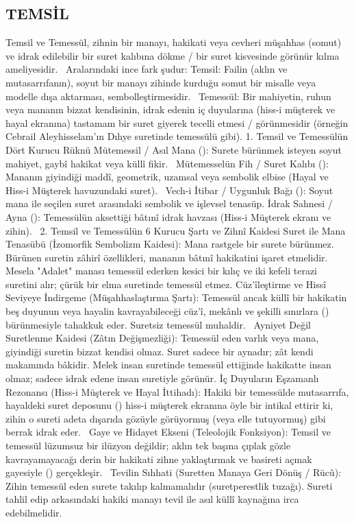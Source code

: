 \documentclass[11pt,a4paper]{article}
\begin{document}
\subsection{TEMSİL}



Temsil ve Temessül, zihnin bir manayı, hakikati veya cevheri müşahhas (somut) ve idrak edilebilir bir suret kalıbına dökme / bir suret kisvesinde görünür kılma ameliyesidir.  
Aralarındaki ince fark şudur:
 Temsil: Failin (aklın ve mutasarrıfanın), soyut bir manayı zihinde kurduğu somut bir misalle veya modelle dışa aktarması, sembolleştirmesidir.  
 Temessül: Bir mahiyetin, ruhun veya mananın bizzat kendisinin, idrak edenin iç duyularına (hiss-i müşterek ve hayal ekranına) tastamam bir suret giyerek tecelli etmesi / görünmesidir (örneğin Cebrail Aleyhisselam'ın Dıhye suretinde temessülü gibi).
1. Temsil ve Temessülün Dört Kurucu Rüknü
 Mütemessil / Asıl Mana (): Surete bürünmek isteyen soyut mahiyet, gaybî hakikat veya küllî fikir.  
 Mütemesselün Fih / Suret Kalıbı (): Mananın giyindiği maddî, geometrik, uzamsal veya sembolik elbise (Hayal ve Hiss-i Müşterek havuzundaki suret).  
 Vech-i İtibar / Uygunluk Bağı (): Soyut mana ile seçilen suret arasındaki sembolik ve işlevsel tenasüp.
 İdrak Sahnesi / Ayna (): Temessülün aksettiği bâtınî idrak havzası (Hiss-i Müşterek ekranı ve zihin).  
2. Temsil ve Temessülün 6 Kurucu Şartı ve Zihnî Kaidesi
 Suret ile Mana Tenasübü (İzomorfik Sembolizm Kaidesi):
Mana rastgele bir surete bürünmez. Bürünen suretin zâhirî özellikleri, mananın bâtınî hakikatini işaret etmelidir. Mesela "Adalet" manası temessül ederken kesici bir kılıç ve iki kefeli terazi suretini alır; çürük bir elma suretinde temessül etmez.
 Cüz'îleştirme ve Hissî Seviyeye İndirgeme (Müşahhaslaştırma Şartı):
Temessül ancak küllî bir hakikatin beş duyunun veya hayalin kavrayabileceği cüz'î, mekânlı ve şekilli sınırlara () bürünmesiyle tahakkuk eder. Suretsiz temessül muhaldir.  
 Ayniyet Değil Suretlenme Kaidesi (Zâtın Değişmezliği):
Temessül eden varlık veya mana, giyindiği suretin bizzat kendisi olmaz. Suret sadece bir aynadır; zât kendi makamında bâkidir. Melek insan suretinde temessül ettiğinde hakikatte insan olmaz; sadece idrak edene insan suretiyle görünür.
 İç Duyuların Eşzamanlı Rezonansı (Hiss-i Müşterek ve Hayal İttihadı):
Hakiki bir temessülde mutasarrıfa, hayaldeki suret deposunu () hiss-i müşterek ekranına öyle bir intikal ettirir ki, zihin o sureti adeta dışarıda gözüyle görüyormuş (veya elle tutuyormuş) gibi berrak idrak eder.  
 Gaye ve Hidayet Ekseni (Teleolojik Fonksiyon):
Temsil ve temessül lüzumsuz bir ilüzyon değildir; aklın tek başına çıplak gözle kavrayamayacağı derin bir hakikati zihne yaklaştırmak ve basireti açmak gayesiyle () gerçekleşir.  
 Tevilin Sıhhati (Suretten Manaya Geri Dönüş / Rücû):
Zihin temessül eden surete takılıp kalmamalıdır (suretperestlik tuzağı). Sureti tahlil edip arkasındaki hakiki manayı tevil ile asıl küllî kaynağına irca edebilmelidir.
\end{document}
